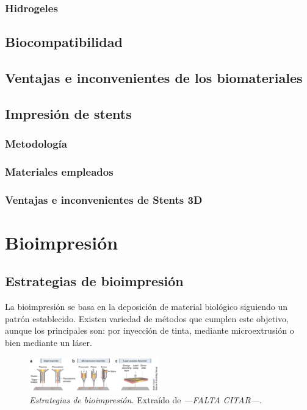 \documentclass[a4paper,12pt]{article}
\begin{document}
\subsubsection{Hidrogeles}

\subsection{Biocompatibilidad}

\subsection{Ventajas e inconvenientes de los biomateriales}

\subsection{Impresión de stents}

\subsubsection{Metodología}

\subsubsection{Materiales empleados}

\subsubsection{Ventajas e inconvenientes de Stents 3D}

\pagebreak
\section{Bioimpresión}
\subsection{Estrategias de bioimpresión}
La bioimpresión se basa en la deposición de material biológico siguiendo un patrón establecido. Existen variedad de métodos que cumplen este objetivo, aunque los principales son: por inyección de tinta, mediante microextrusión o bien mediante un láser.

	\begin{figure}[!ht]
	\begin{center}
	  \includegraphics[width=0.5\textwidth]{Figuras/tiposBioimpresion.eps}
	  \caption{\emph{Estrategias de bioimpresión. }Extraído de \emph{---FALTA CITAR---}.}
	\end{center}
	\label{tiposBioimpresion}
	\end{figure}
\end{document}
